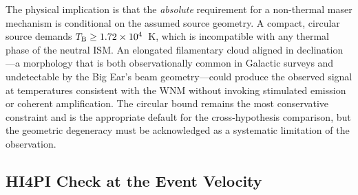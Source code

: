 \documentclass[twocolumn]{aastex701}
\newcommand{\tbeq}{T_{\rm B}}
\begin{document}
The physical implication is that the \emph{absolute} requirement for a non-thermal maser mechanism is conditional on the assumed source geometry. A compact, circular source demands $\tbeq\geq1.72\times10^4$~K, which is incompatible with any thermal phase of the neutral ISM. An elongated filamentary cloud aligned in declination---a morphology that is both observationally common in Galactic  surveys and undetectable by the Big Ear's beam geometry---could produce the observed signal at temperatures consistent with the WNM without invoking stimulated emission or coherent amplification. The circular bound remains the most conservative constraint and is the appropriate default for the cross-hypothesis comparison, but the geometric degeneracy must be acknowledged as a systematic limitation of the observation.

\subsection{HI4PI Check at the Event Velocity}
\label{sec:hi4pi}
\end{document}
